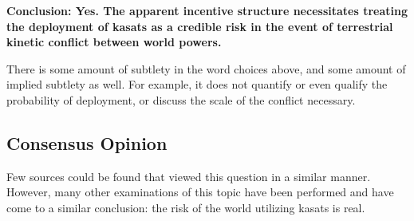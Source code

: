 \begin{blockquote}
  {\bf Conclusion: Yes.  The apparent incentive structure necessitates
    treating the deployment of \acp{kasat} as a credible risk in the
    event of terrestrial kinetic conflict between world powers.}
\end{blockquote}

There is some amount of subtlety in the word choices above, and some
amount of implied subtlety as well.  For example, it does not quantify
or even qualify the probability of deployment, or discuss the scale of
the conflict necessary.


\subsection{Consensus Opinion}

Few sources could be found that viewed this question in a similar
manner.  However, many other examinations of this topic have been
performed and have come to a similar conclusion: the risk of the world
utilizing \acp{kasat} is real.


